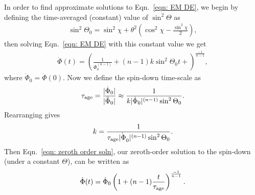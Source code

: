 \documentclass[../full_thesis/full_thesis.tex]{subfiles}
\begin{document}
In order to find approximate solutions to Eqn.~\eqref{eqn: EM DE}, we begin by
defining the time-averaged (constant) value of $\sin^{2}\Theta$ as
\begin{align}
\sin^{2}\Theta_0 =
\sin^{2}\chi + \theta^{2}\left(\cos^{2}\chi - \frac{\sin^{2}\chi}{2}\right),
\label{eqn: sin2Theta0}
\end{align}
then solving Eqn.~\eqref{eqn: EM DE} with this constant value we get
\begin{align}
\dot{\Phi}(t) = \left(\frac{1}{\dot{\Phi}_0^{(n-1)}}
                      + (n-1)k\sin^{2}\Theta_0 t + \right)^{\frac{-1}{n-1}},
\label{eqn: zeroth order soln}
\end{align}
where $\dot{\Phi}_0 = \dot{\Phi}(0)$. Now we define the spin-down time-scale as
\begin{align}
\tau_{\mathrm{age}} = \frac{|\dot{\Phi}_0|}{|\ddot{\Phi}_0|}
\approx \frac{1}{k|\dot{\Phi}_0|^{(n-1)} \sin^{2}\Theta_0}.
\end{align}
Rearranging gives
\begin{align}
k = \frac{1}{\tau_{\mathrm{age}} \dot{|\Phi}_0|^{(n-1)} \sin^{2}\Theta_0}.
\end{align}
Then Eqn.~\eqref{eqn: zeroth order soln}, our zeroth-order solution to the
spin-down (under a constant $\Theta$), can be written as
\begin{align}
\dot{\Phi}(t) = \dot{\Phi}_0\left(1 + (n-1)\frac{t}{\tau_{\mathrm{age}}}\right)^{\frac{-1}{n-1}}.
\label{eqn: zeroth order soln complete}
\end{align}
\end{document}
